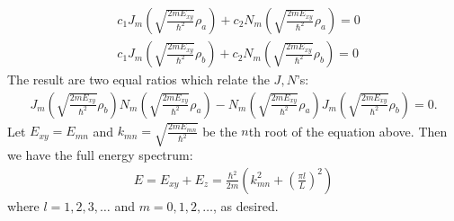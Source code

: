 \documentclass{article}
\theoremstyle{definition}
\newcommand{\f}[2]{\frac{#1}{#2}}
\newcommand{\lp}{\left(}
\newcommand{\rp}{\right)}
\begin{document}
\begin{enumerate}[label=(\alph*)]
	\begin{align*}
	& c_1 J_m\lp \sqrt{\f{2mE_{xy}}{\hbar^2}}\rho_a\rp + c_2 N_m\lp \sqrt{\f{2mE_{xy}}{\hbar^2}}\rho_a\rp = 0\\
	& c_1 J_m\lp \sqrt{\f{2mE_{xy}}{\hbar^2}}\rho_b\rp + c_2 N_m\lp \sqrt{\f{2mE_{xy}}{\hbar^2}}\rho_b\rp = 0
	\end{align*}
	The result are two equal ratios which relate the $J,N$'s:
	\begin{align*}
	J_m\lp\sqrt{\f{2mE_{xy}}{\hbar^2}}\rho_b\rp N_m\lp \sqrt{\f{2mE_{xy}}{\hbar^2}}\rho_a \rp - N_m\lp \sqrt{\f{2mE_{xy}}{\hbar^2}}\rho_a \rp J_m\lp \sqrt{\f{2mE_{xy}}{\hbar^2}}\rho_b \rp = 0.
	\end{align*}
	Let $E_{xy} = E_{mn}$ and $k_{mn} = \sqrt{\f{2mE_{mn}}{\hbar^2}}$ be the $n$th root of the equation above. Then we have the full energy spectrum:
	\begin{align*}
	E = E_{xy} + E_z = \f{\hbar^2}{2m} \lp k_{mn}^2 + \lp \f{\pi l}{L} \rp^2 \rp
	\end{align*}
	where $l=1,2,3,\dots$ and $m=0,1,2,\dots$, as desired. 
	

\end{enumerate}
\end{document}
